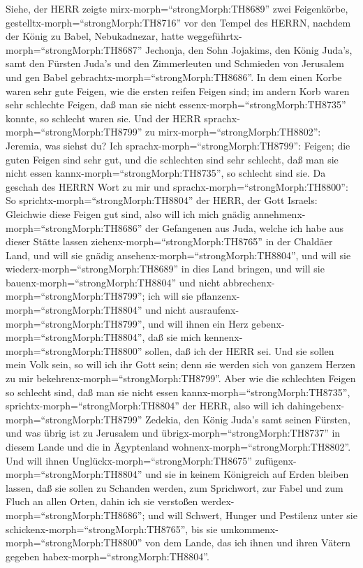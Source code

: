  Siehe, der HERR zeigte mirx-morph=``strongMorph:TH8689''
zwei Feigenkörbe, gestelltx-morph=``strongMorph:TH8716'' vor den Tempel
des HERRN, nachdem der König zu Babel, Nebukadnezar, hatte
weggeführtx-morph=``strongMorph:TH8687'' Jechonja, den Sohn Jojakims,
den König Juda's, samt den Fürsten Juda's und den Zimmerleuten und
Schmieden von Jerusalem und gen Babel
gebrachtx-morph=``strongMorph:TH8686''.  In dem einen Korbe
waren sehr gute Feigen, wie die ersten reifen Feigen sind; im andern
Korb waren sehr schlechte Feigen, daß man sie nicht
essenx-morph=``strongMorph:TH8735'' konnte, so schlecht waren sie.
 Und der HERR sprachx-morph=``strongMorph:TH8799'' zu
mirx-morph=``strongMorph:TH8802'': Jeremia, was siehst du? Ich
sprachx-morph=``strongMorph:TH8799'': Feigen; die guten Feigen sind sehr
gut, und die schlechten sind sehr schlecht, daß man sie nicht essen
kannx-morph=``strongMorph:TH8735'', so schlecht sind sie. 
Da geschah des HERRN Wort zu mir und
sprachx-morph=``strongMorph:TH8800'':  So
sprichtx-morph=``strongMorph:TH8804'' der HERR, der Gott Israels:
Gleichwie diese Feigen gut sind, also will ich mich gnädig
annehmenx-morph=``strongMorph:TH8686'' der Gefangenen aus Juda, welche
ich habe aus dieser Stätte lassen ziehenx-morph=``strongMorph:TH8765''
in der Chaldäer Land,  und will sie gnädig
ansehenx-morph=``strongMorph:TH8804'', und will sie
wiederx-morph=``strongMorph:TH8689'' in dies Land bringen, und will sie
bauenx-morph=``strongMorph:TH8804'' und nicht
abbrechenx-morph=``strongMorph:TH8799''; ich will sie
pflanzenx-morph=``strongMorph:TH8804'' und nicht
ausraufenx-morph=``strongMorph:TH8799'',  und will ihnen ein
Herz gebenx-morph=``strongMorph:TH8804'', daß sie mich
kennenx-morph=``strongMorph:TH8800'' sollen, daß ich der HERR sei. Und
sie sollen mein Volk sein, so will ich ihr Gott sein; denn sie werden
sich von ganzem Herzen zu mir bekehrenx-morph=``strongMorph:TH8799''.
 Aber wie die schlechten Feigen so schlecht sind, daß man
sie nicht essen kannx-morph=``strongMorph:TH8735'',
sprichtx-morph=``strongMorph:TH8804'' der HERR, also will ich
dahingebenx-morph=``strongMorph:TH8799'' Zedekia, den König Juda's samt
seinen Fürsten, und was übrig ist zu Jerusalem und
übrigx-morph=``strongMorph:TH8737'' in diesem Lande und die in
Ägyptenland wohnenx-morph=``strongMorph:TH8802''.  Und will
ihnen Unglückx-morph=``strongMorph:TH8675''
zufügenx-morph=``strongMorph:TH8804'' und sie in keinem Königreich auf
Erden bleiben lassen, daß sie sollen zu Schanden werden, zum Sprichwort,
zur Fabel und zum Fluch an allen Orten, dahin ich sie verstoßen
werdex-morph=``strongMorph:TH8686'';  und will Schwert,
Hunger und Pestilenz unter sie schickenx-morph=``strongMorph:TH8765'',
bis sie umkommenx-morph=``strongMorph:TH8800'' von dem Lande, das ich
ihnen und ihren Vätern gegeben habex-morph=``strongMorph:TH8804''.

